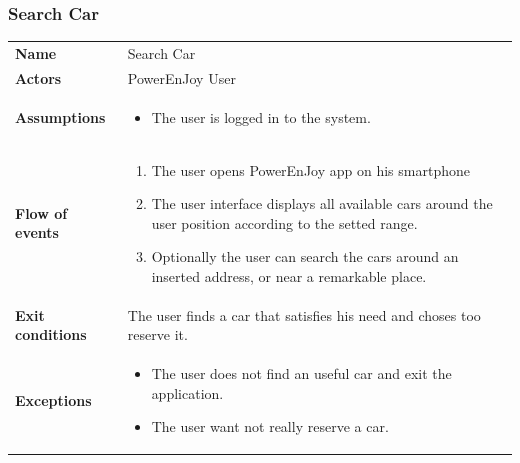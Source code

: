 \documentclass[english]{article}
\begin{document}
	\subsubsection{Search Car}
	\begin{center}
	\begin{tabular}{l||p{10cm}}
	\textbf{Name} 
		& Search Car\\ [8px]
	\textbf{Actors} 
		& PowerEnJoy User\\ [8px]
	\textbf{Assumptions} 
		& \begin{itemize}
			\item The user is logged in to the system.
		\end{itemize}\\
	\textbf{Flow of events}
		& \begin{enumerate}
	 		\item The user opens PowerEnJoy app on his smartphone 
	 		\item The user interface displays all available cars around the user position according to the setted range. 
			\item Optionally the user can search the cars around an inserted address, or near a remarkable place. 
		\end{enumerate}\\ 
	\textbf{Exit conditions}
		&The user finds a car that satisfies his need and choses too reserve it.\\ [8px]
	\textbf{Exceptions}
		& \begin{itemize}
			\item The user does not find an useful car and exit the application.
			\item The user want not really reserve a car. 
		\end{itemize}
	\end{tabular}
	\end{center}
\end{document}
